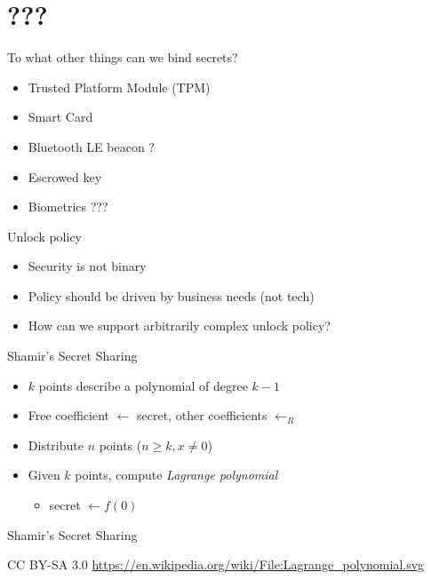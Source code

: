\documentclass[ignorenonframetext,aspectratio=169]{beamer}
\def\svgwidth{4cm}
\begin{document}
\hypertarget{section-3}{%
\section{???}\label{section-3}}

\begin{frame}{To what other things can we bind secrets?}
\protect\hypertarget{to-what-other-things-can-we-bind-secrets}{}
\begin{itemize}
\item Trusted Platform Module (TPM)
\item Smart Card
\item Bluetooth LE beacon ?
\item Escrowed key
\item Biometrics ???
\end{itemize}
\end{frame}

\begin{frame}{Unlock policy}
\protect\hypertarget{unlock-policy}{}
\begin{itemize}
\item Security is not binary
\item Policy should be driven by business needs (not tech)
\item How can we support arbitrarily complex unlock policy?
\end{itemize}
\end{frame}

\begin{frame}{Shamir's Secret Sharing}
\protect\hypertarget{shamirs-secret-sharing}{}

\begin{itemize}
\item
  \(k\) points describe a polynomial of degree \(k - 1\)
\item
  Free coefficient \(\gets\) secret, other coefficients \(\gets_R\)
\item
  Distribute \(n\) points (\(n \ge k, x \ne 0\))
\item
  Given \(k\) points, compute \emph{Lagrange polynomial}

  \begin{itemize}
  \item
    secret \(\gets f(0)\)
  \end{itemize}
\end{itemize}

\end{frame}

\begin{frame}{Shamir's Secret Sharing}
\protect\hypertarget{shamirs-secret-sharing-plot}{}

\begin{center}
\def\svgwidth{.8\columnwidth}

\end{center}
\tiny

CC BY-SA 3.0
\url{https://en.wikipedia.org/wiki/File:Lagrange_polynomial.svg}

\end{frame}
\end{document}
